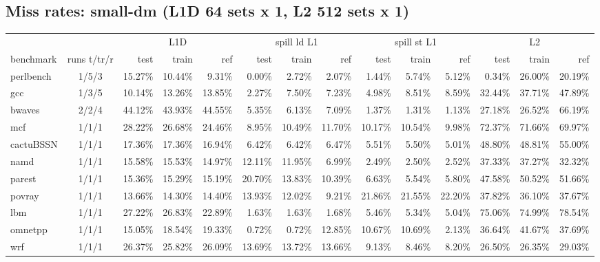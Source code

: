 \documentclass[10pt,a4paper,landscape]{article}
\begin{document}
\subsection*{Miss rates: small-dm (L1D 64 sets x 1, L2 512 sets x 1)}
{\footnotesize
\begin{longtable}{lcrrrrrrrrrrrr}
\toprule
& & \multicolumn{3}{c}{L1D} & \multicolumn{3}{c}{spill ld L1} & \multicolumn{3}{c}{spill st L1} & \multicolumn{3}{c}{L2} \\
\cmidrule(lr){3-5}\cmidrule(lr){6-8}\cmidrule(lr){9-11}\cmidrule(lr){12-14}
benchmark & runs t/tr/r & test & train & ref & test & train & ref & test & train & ref & test & train & ref \\
\midrule
\endhead
\bottomrule
\endfoot
perlbench & 1/5/3 & 15.27\% & 10.44\% & 9.31\% & 0.00\% & 2.72\% & 2.07\% & 1.44\% & 5.74\% & 5.12\% & 0.34\% & 26.00\% & 20.19\% \\
gcc & 1/3/5 & 10.14\% & 13.26\% & 13.85\% & 2.27\% & 7.50\% & 7.23\% & 4.98\% & 8.51\% & 8.59\% & 32.44\% & 37.71\% & 47.89\% \\
bwaves & 2/2/4 & 44.12\% & 43.93\% & 44.55\% & 5.35\% & 6.13\% & 7.09\% & 1.37\% & 1.31\% & 1.13\% & 27.18\% & 26.52\% & 66.19\% \\
mcf & 1/1/1 & 28.22\% & 26.68\% & 24.46\% & 8.95\% & 10.49\% & 11.70\% & 10.17\% & 10.54\% & 9.98\% & 72.37\% & 71.66\% & 69.97\% \\
cactuBSSN & 1/1/1 & 17.36\% & 17.36\% & 16.94\% & 6.42\% & 6.42\% & 6.47\% & 5.51\% & 5.50\% & 5.01\% & 48.80\% & 48.81\% & 55.00\% \\
namd & 1/1/1 & 15.58\% & 15.53\% & 14.97\% & 12.11\% & 11.95\% & 6.99\% & 2.49\% & 2.50\% & 2.52\% & 37.33\% & 37.27\% & 32.32\% \\
parest & 1/1/1 & 15.36\% & 15.29\% & 15.19\% & 20.70\% & 13.83\% & 10.39\% & 6.63\% & 5.54\% & 5.80\% & 47.58\% & 50.52\% & 51.66\% \\
povray & 1/1/1 & 13.66\% & 14.30\% & 14.40\% & 13.93\% & 12.02\% & 9.21\% & 21.86\% & 21.55\% & 22.20\% & 37.82\% & 36.10\% & 37.67\% \\
lbm & 1/1/1 & 27.22\% & 26.83\% & 22.89\% & 1.63\% & 1.63\% & 1.68\% & 5.46\% & 5.34\% & 5.04\% & 75.06\% & 74.99\% & 78.54\% \\
omnetpp & 1/1/1 & 15.05\% & 18.54\% & 19.33\% & 0.72\% & 0.72\% & 12.85\% & 10.67\% & 10.69\% & 2.13\% & 36.64\% & 41.67\% & 37.69\% \\
wrf & 1/1/1 & 26.37\% & 25.82\% & 26.09\% & 13.69\% & 13.72\% & 13.66\% & 9.13\% & 8.46\% & 8.20\% & 26.50\% & 26.35\% & 29.03\% \\

\end{longtable}}
\end{document}
